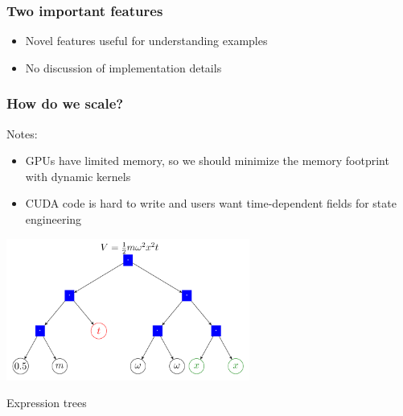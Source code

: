 \documentclass{beamer}
\begin{document}
\begin{frame}
\frametitle{Two important features}

\begin{itemize}
\item Novel features useful for understanding examples
\item No discussion of implementation details
\end{itemize}
\end{frame}


\begin{frame}
\frametitle{How do we scale?}

Notes:
\begin{itemize}
\item GPUs have limited memory, so we should minimize the memory footprint with dynamic kernels
\item CUDA code is hard to write and users want time-dependent fields for state engineering
\end{itemize}

\center \includegraphics[width=0.6\textwidth]{expr_tree.png}

\center Expression trees
\end{frame}
\end{document}
